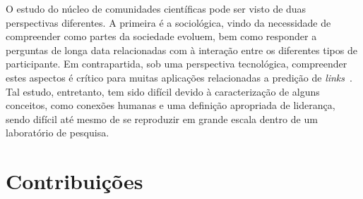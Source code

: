 
O estudo do núcleo de comunidades científicas pode ser visto de duas perspectivas diferentes. A 
primeira é a sociológica, vindo da necessidade de compreender como partes da sociedade evoluem, 
bem como responder a perguntas de longa data relacionadas com à interação entre os diferentes 
tipos de participante. Em contrapartida, sob uma perspectiva tecnológica, compreender estes 
aspectos é crítico para muitas aplicações relacionadas a predição de \textit{links}~\citep{Getoor2005}. Tal estudo, entretanto, 
tem sido difícil devido à caracterização de alguns conceitos, como conexões humanas e uma definição apropriada 
de liderança, sendo difícil até mesmo de se reproduzir em grande escala dentro de um laboratório de pesquisa.



\section{Contribuições}

